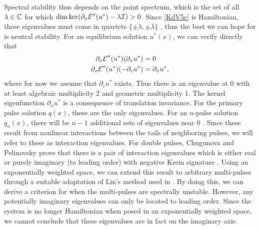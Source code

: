 \documentclass[11pt,reqno]{amsart}
\theoremstyle{plain}
\theoremstyle{definition}
\theoremstyle{remark}
\begin{document}
Spectral stability thus depends on the point spectrum, which is the set of all $\lambda \in \mathbb{C}$ for which $\mathop\mathrm{dim}\nolimits \mathop\mathrm{ker}\nolimits(\partial_x \mathcal{E}''(u^*) - \lambda \mathcal{I}) > 0$. Since \cref{KdV5c} is Hamiltonian, these eigenvalues must come in quartets $\{ \pm \lambda, \pm \overline{\lambda}\}$ \cite[Proposition 5.1.2]{Kapitula2013}, thus the best we can hope for is neutral stability. For an equilibrium solution $u^*(x)$, we can verify directly that 
\begin{align*}
\partial_x \mathcal{E}''(u^*) (\partial_x u^*) &= 0 \\
\partial_x \mathcal{E}''(u^*) (-\partial_c u^*) &= \partial_x u^*,
\end{align*}
where for now we assume that $\partial_c u^*$ exists. Thus there is an eigenvalue at 0 with at least algebraic multiplicity 2 and geometric multiplicity 1. The kernel eigenfunction $\partial_x u^*$ is a consequence of translation invariance. For the primary pulse solution $q(x)$, these are the only eigenvalues. For an $n$-pulse solution $q_n(x)$, there will be $n-1$ additional sets of eigenvalues near 0 \cite{Sandstede1998}. Since these result from nonlinear interactions between the tails of neighboring pulses, we will refer to these as interaction eigenvalues. For double pulses, Chugunova and Pelinovsky prove that there is a pair of interaction eigenvalues which is either real or purely imaginary (to leading order) with negative Krein signature \cite[Theorem 2.3]{Pelinovsky2007}. Using an exponentially weighted space, we can extend this result to arbitrary multi-pulses through a suitable adaptation of Lin's method used in \cite{Sandstede1998}. By doing this, we can derive a criterion for when the multi-pulses are spectrally unstable. However, any potentially imaginary eigenvalues can only be located to leading order. Since the system is no longer Hamiltonian when posed in an exponentially weighted space, we cannot conclude that these eigenvalues are in fact on the imaginary axis.
\end{document}
